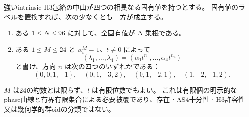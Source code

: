 \begin{theorem}[四曲線方向と有界有限位数部分による全必要被覆]
\label{thm:cubic-four-simple-four-curve-cover}
強いintrinsic H3包絡の中山が四つの相異なる固有値を持つとする。
固有値のラベルを置換すれば、次の少なくとも一方が成立する。
\begin{enumerate}
\item ある $1\le N\le96$ に対して、全固有値が $N$ 乗根である。
\item ある $1\le M\le24$ と $\alpha_i^M=1$、$t\ne0$ によって
\[
 (\lambda_1,\ldots,\lambda_4)=(\alpha_1t^{n_1},\ldots,\alpha_4t^{n_4})
\]
と書け、方向 $n$ は次の四つのいずれかである：
\[
 (0,0,1,-1),\quad (0,1,-3,2),\quad
 (0,1,-2,1),\quad (1,-2,-1,2).
\]
\end{enumerate}
$M$ は24の約数とは限らず、$t$ は有限位数でもよい。
これは有限個の明示的なphase曲線と有界有限集合による必要被覆であり、存在・AS4十分性・H3許容性又は幾何学的群oidの分類ではない。
\end{theorem}
